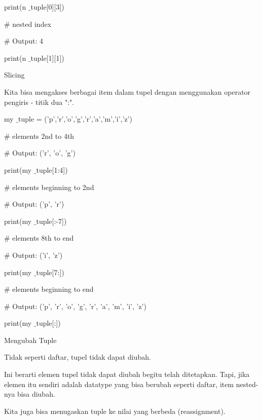 print(n $  \_  $tuple[0][3]) \par
\vspace{12pt}
 $  \#  $ nested index \par
 $  \#  $ Output: 4 \par
print(n $  \_  $tuple[1][1]) \par
\vspace{12pt}
Slicing \par
\vspace{12pt}
Kita bisa mengakses berbagai item dalam tupel dengan menggunakan operator pengiris - titik dua ":". \par
\vspace{12pt}
my $  \_  $tuple = ('p','r','o','g','r','a','m','i','z') \par
\vspace{12pt}
 $  \#  $ elements 2nd to 4th \par
 $  \#  $ Output: ('r', 'o', 'g') \par
print(my $  \_  $tuple[1:4]) \par
\vspace{12pt}
 $  \#  $ elements beginning to 2nd \par
 $  \#  $ Output: ('p', 'r') \par
print(my $  \_  $tuple[:-7]) \par
\vspace{12pt}
 $  \#  $ elements 8th to end \par
 $  \#  $ Output: ('i', 'z') \par
print(my $  \_  $tuple[7:]) \par
\vspace{12pt}
 $  \#  $ elements beginning to end \par
 $  \#  $ Output: ('p', 'r', 'o', 'g', 'r', 'a', 'm', 'i', 'z') \par
print(my $  \_  $tuple[:]) \par
\vspace{12pt}
Mengubah Tuple \par
\vspace{12pt}
Tidak seperti daftar, tupel tidak dapat diubah. \par
\vspace{12pt}
Ini berarti elemen tupel tidak dapat diubah begitu telah ditetapkan. Tapi, jika elemen itu sendiri adalah datatype yang bisa berubah seperti daftar, item nested-nya bisa diubah. \par
\vspace{12pt}
Kita juga bisa menugaskan tuple ke nilai yang berbeda (reassignment). \par
